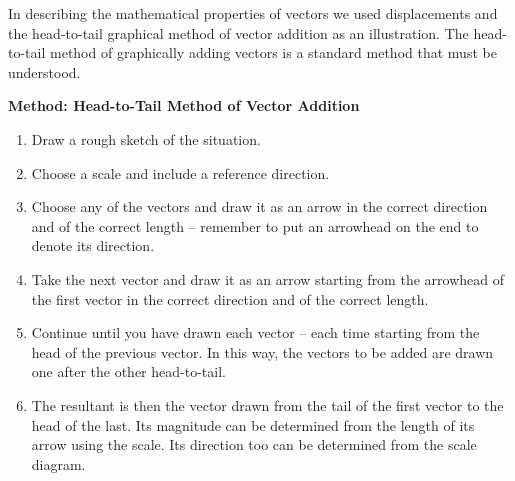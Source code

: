           
          \label{m38815*id189280}In describing the mathematical properties of vectors we used
displacements and the head-to-tail graphical method of vector addition
as an illustration. The head-to-tail method of graphically adding vectors is a standard method that must be understood.\par 
          \label{m38815*id189285}
            \textbf{Method: Head-to-Tail Method of Vector Addition}
          \par 
          \label{m38815*id189292}\begin{enumerate}[noitemsep, label=\textbf{\arabic*}. ] 
            \label{m38815*uid40}\item Draw a rough sketch of the situation.
\label{m38815*uid41}\item Choose a scale and include a reference direction.
\label{m38815*uid42}\item Choose any of the vectors and draw it as an arrow in the
correct direction and of the correct length -- remember to put an
arrowhead on the end to denote its direction.
\label{m38815*uid43}\item Take the next vector and draw it as an arrow starting from the
arrowhead of the first vector in the correct direction and of the
correct length.
\label{m38815*uid44}\item Continue until you have drawn each vector -- each time starting
from the head of the previous vector. In this way, the vectors to be
added are drawn one after the other head-to-tail.
\label{m38815*uid45}\item The resultant is then the vector drawn from the tail of the
first vector to the head of the last. Its magnitude can be
determined from the length of its arrow using the scale. Its
direction too can be determined from the scale diagram.
\end{enumerate}
        
\par
            \label{m38815*secfhsst!!!underscore!!!id738}\vspace{.5cm} 
      

